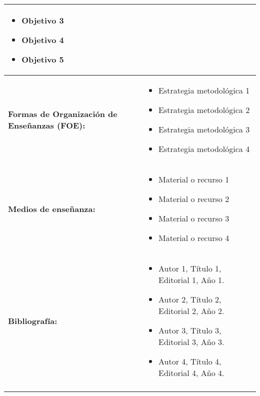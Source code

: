 \begin{xltabular}{\linewidth}{@{}>{\bfseries}X X@{}}
\begin{itemize}
        \item Objetivo 3
        \item Objetivo 4
        \item Objetivo 5
    \end{itemize}               \\
    \midrule
    Formas de Organización de Enseñanzas (FOE): & \begin{itemize}
        \item Estrategia metodológica 1
        \item Estrategia metodológica 2
        \item Estrategia metodológica 3
        \item Estrategia metodológica 4
    \end{itemize}                               \\
    \midrule
    Medios de enseñanza:                       & \begin{itemize}
        \item Material o recurso 1
        \item Material o recurso 2
        \item Material o recurso 3
        \item Material o recurso 4
    \end{itemize}                               \\
    \midrule
    Bibliografía:                              & \begin{itemize}
        \item Autor 1, Título 1, Editorial 1, Año 1.
        \item Autor 2, Título 2, Editorial 2, Año 2.
        \item Autor 3, Título 3, Editorial 3, Año 3.
        \item Autor 4, Título 4, Editorial 4, Año 4.
    \end{itemize}                               \\                                         \\
    \bottomrule
\end{xltabular}
\pagebreak